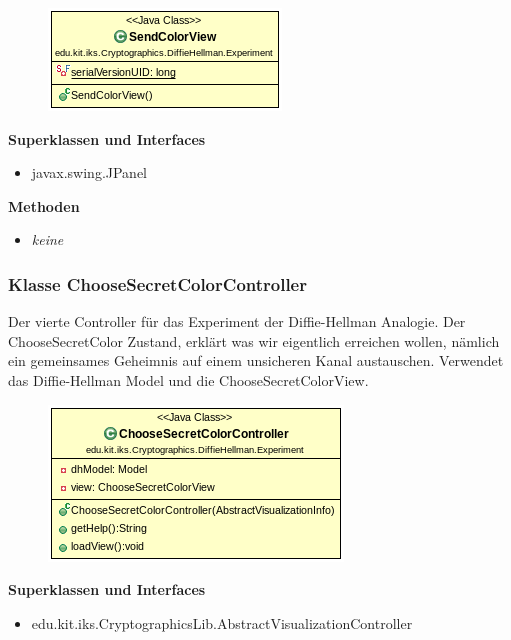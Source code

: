 \documentclass{article}
\begin{document}
      \begin{figure}[H]
        \centering
        \includegraphics{resources/edu-kit-iks-Cryptographics-DiffieHellman-Experiment-SendColorView}
      \end{figure}

      \textbf{Superklassen und Interfaces}
      \begin{itemize}
        \item javax.swing.JPanel
      \end{itemize}

      \textbf{Methoden}
      \begin{itemize}
        \item \textit{keine}
      \end{itemize}

\subsubsection{Klasse ChooseSecretColorController}
      Der vierte Controller für das Experiment der Diffie-Hellman Analogie.
      Der ChooseSecretColor Zustand, erklärt was wir eigentlich erreichen wollen,
      nämlich ein gemeinsames Geheimnis auf einem unsicheren Kanal austauschen.
      Verwendet das Diffie-Hellman Model und die ChooseSecretColorView.

      \begin{figure}[H]
        \centering
        \includegraphics{resources/edu-kit-iks-Cryptographics-DiffieHellman-Experiment-ChooseSecretColorController}
      \end{figure}

      \textbf{Superklassen und Interfaces}
      \begin{itemize}
        \item edu.kit.iks.CryptographicsLib.AbstractVisualizationController
      \end{itemize}
\end{document}
